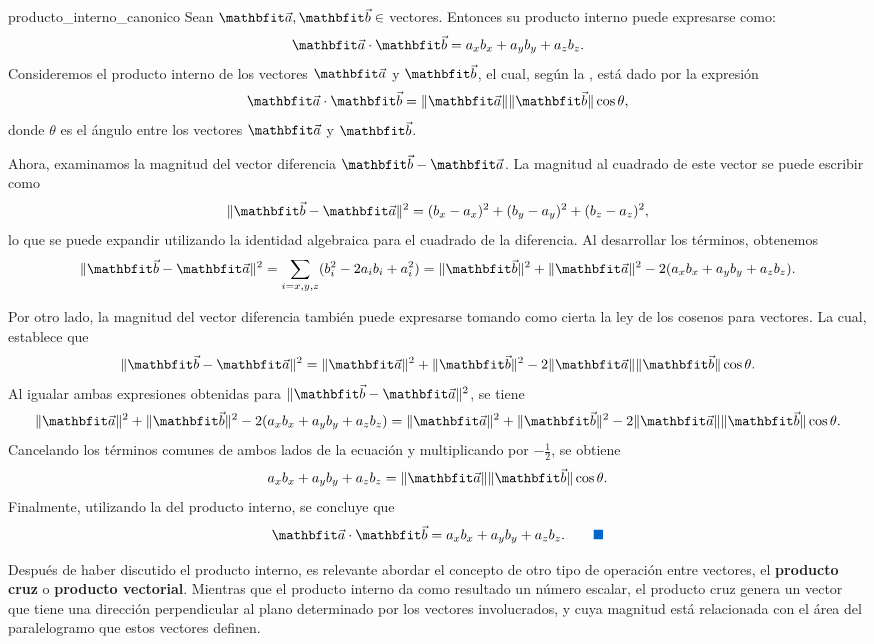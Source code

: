 \begin{theorem}{}{producto_interno_canonico}
    Sean $\veca, \vecb \in$ \RR[3] vectores. Entonces su producto interno puede expresarse como:
    $$\veca \cdot \vecb = a_x b_x + a_y b_y + a_z b_z.$$
    \dem Consideremos el producto interno de los vectores $\veca$ y $\vecb$, el cual, según la , está dado por la expresión
        $$\veca \cdot \vecb = \|\veca\| \|\vecb\| \cos \theta,$$
        donde $\theta$ es el ángulo entre los vectores $\veca$ y $\vecb$.
        
        Ahora, examinamos la magnitud del vector diferencia $ \vecb - \veca $. La magnitud al cuadrado de este vector se puede escribir como
        $$\|\vecb - \veca\|^2 = (b_x - a_x)^2 + (b_y - a_y)^2 + (b_z - a_z)^2,$$
        lo que se puede expandir utilizando la identidad algebraica para el cuadrado de la diferencia. Al desarrollar los términos, obtenemos
        $$\|\vecb - \veca\|^2 = \sum_{i=x,y,z} (b_i^2 - 2a_i b_i + a_i^2) = \|\vecb\|^2 + \|\veca\|^2 - 2(a_x b_x + a_y b_y + a_z b_z).$$
        
        Por otro lado, la magnitud del vector diferencia también puede expresarse tomando como cierta la ley de los cosenos para vectores. La cual, establece que
        $$\|\vecb - \veca\|^2 = \|\veca\|^2 + \|\vecb\|^2 - 2 \|\veca\| \|\vecb\| \cos \theta.$$
        Al igualar ambas expresiones obtenidas para $\|\vecb - \veca\|^2$, se tiene
        $$\|\veca\|^2 + \|\vecb\|^2 - 2(a_x b_x + a_y b_y + a_z b_z) = \|\veca\|^2 + \|\vecb\|^2 - 2 \|\veca\| \|\vecb\| \cos \theta.$$
        Cancelando los términos comunes de ambos lados de la ecuación y multiplicando por $-\frac{1}{2}$, se obtiene
        $$a_x b_x + a_y b_y + a_z b_z = \|\veca\| \|\vecb\| \cos \theta.$$
        Finalmente, utilizando la  del producto interno, se concluye que
        \begin{equation*}
            \veca \cdot \vecb = a_x b_x + a_y b_y + a_z b_z. \tag*{\BlackSquare}
        \end{equation*}
\end{theorem}

Después de haber discutido el producto interno, es relevante abordar el concepto de otro tipo de operación entre vectores, el \textbf{producto cruz} o \textbf{producto vectorial}. Mientras que el producto interno da como resultado un número escalar, el producto cruz genera un vector que tiene una dirección perpendicular al plano determinado por los vectores involucrados, y cuya magnitud está relacionada con el área del paralelogramo que estos vectores definen.

